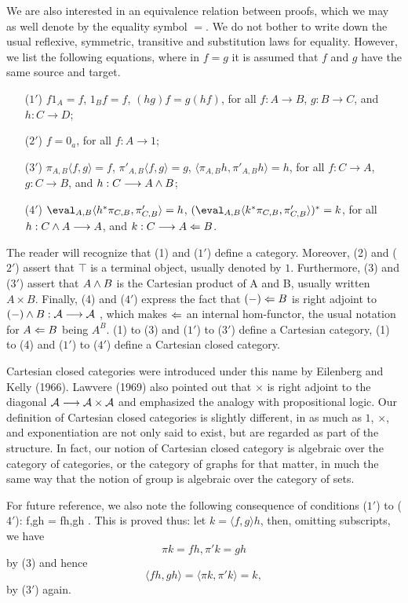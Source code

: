 We are also interested in an equivalence relation between proofs,
which we may as well denote by the equality symbol $=$. We do not bother to
write down the usual reflexive, symmetric, transitive and substitution laws for
equality. However, we list the following equations, where in $f = g$ it is
assumed that $f$ and $g$ have the same source and target.
\begin{enumerate}[align=left]
\item[($1'$)]$f1_A = f$, $1_Bf = f$, $(hg)f = g(hf)$,
 for all $f:A \to B$, $g:B \to C$, and $h: C\to D$;
\item[($2'$)] $f= 0_a$, for all $f: A \to 1$;
\item[($3'$)] $\pi_{A,B}\langle f,g \rangle = f$, $\pi'_{A,B}\langle f,g \rangle = g$,
$\langle\pi_{A,B} h, \pi'_{A,B} h\rangle = h$, for all $f:C \to A$, $g:C \to B$, and $h: C\longrightarrow A\wedge B$;
\item[($4'$)] $\eval_{A,B}\langle h^*\pi_{C,B}, \pi'_{C,B}\rangle = h$,
$(\eval_{A,B}\langle k^*\pi_{C,B}, \pi'_{C,B}\rangle)^* = k$,
for all $h: C\wedge A \longrightarrow A$, and $k: C \longrightarrow A \Leftarrow B$.
\end{enumerate}
The reader will recognize that (1) and ($1'$) define a category.
Moreover, (2) and ($2'$) assert that $\top$
is a terminal object, usually denoted by $1$.
Furthermore, (3) and ($3'$) assert that $A \wedge B$ is the Cartesian product
of A and B, usually written $A \times B$.
Finally, (4) and ($4'$) express the fact that $(-) \Leftarrow B$ is right adjoint to
$(-) \wedge B: {\cal A} \longrightarrow {\cal A}$ , which makes $\Leftarrow$ an internal hom-functor, the
usual notation for $A \Leftarrow B$ being $A^B$.
(1) to (3) and ($1'$) to ($3'$) define a Cartesian category,
(1) to (4) and ($1'$) to ($4'$) define a Cartesian closed category.

Cartesian closed categories were introduced under this name
by Eilenberg and Kelly (1966). Lawvere (1969) also pointed out that $\times$
is right adjoint to the diagonal ${\cal A} \longrightarrow {\cal A} \times {\cal A}$ and emphasized the analogy
with propositional logic. Our definition of Cartesian closed categories is slightly different,
in as much as $1$, $\times$, and exponentiation are not only said to exist, but are regarded
as part of the structure. In fact, our notion of Cartesian closed category is algebraic over
the category of categories, or the category of graphs for that matter, in much the same way
that the notion of group is algebraic over the category of sets.

For future reference, we also note the following consequence of conditions ($1'$) to ($4'$):
\bes
\langle f,g\rangle h = \langle fh,gh \rangle .
\ees
This is proved thus: let $k = \langle f,g\rangle h$, then, omitting subscripts, we have
$$
\pi k=fh, \pi' k=gh
$$
by (3) and hence
$$
\langle fh,gh \rangle = \langle \pi k,\pi' k\rangle = k,
$$
by ($3'$) again.


